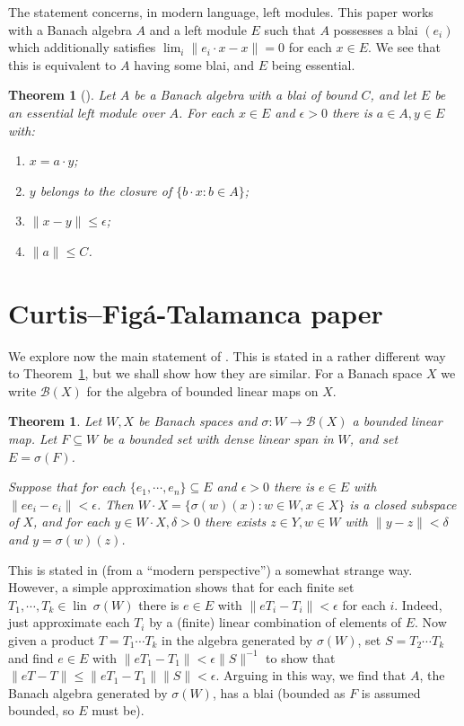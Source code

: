\documentclass[a4paper,11pt]{article}
\newcommand{\mc}[1]{{\mathcal{#1}}}
\newcommand{\lin}{{\operatorname{lin}}}
\newtheorem{theorem}[lemma]{Theorem}
\theoremstyle{definition}
\begin{document}
The statement concerns, in modern language, left modules.  This paper works with a Banach
algebra $A$ and a left module $E$ such that $A$ possesses a blai $(e_i)$ which additionally
satisfies $\lim_i \|e_i\cdot x-x\| =0$ for each $x\in E$.  We see that this is equivalent to
$A$ having some blai, and $E$ being essential.

\begin{theorem}[{\cite[Theorem~2.5]{hewitt}}]\label{thm:ch}
Let $A$ be a Banach algebra with a blai of bound $C$, and let $E$ be an essential left module
over $A$. For each $x\in E$ and $\epsilon>0$ there is $a\in A, y\in E$ with:
\begin{enumerate}
\item $x = a\cdot y$;
\item $y$ belongs to the closure of $\{b\cdot x : b\in A\}$;
\item $\|x-y\| \leq \epsilon$;
\item $\|a\|\leq C$.
\end{enumerate}  
\end{theorem}



\section{Curtis--Fig\'a-Talamanca paper}

We explore now the main statement of \cite{cft}.  This is stated in a rather different
way to Theorem~\ref{thm:ch}, but we shall show how they are similar.
For a Banach space $X$ we write $\mathcal B(X)$ for the algebra of bounded linear maps on $X$.

\begin{theorem}\label{thm:cft}
Let $W,X$ be Banach spaces and $\sigma:W\rightarrow \mc B(X)$ a bounded linear map.
Let $F\subseteq W$ be a bounded set with dense linear span in $W$, and set $E=\sigma(F)$.

Suppose that for each $\{e_1,\cdots,e_n\} \subseteq E$ and $\epsilon>0$ there is $e\in E$
with $\|ee_i - e_i\| < \epsilon$.  Then $W\cdot X = \{ \sigma(w)(x) : w\in W, x\in X \}$
is a closed subspace of $X$, and for each $y\in W\cdot X, \delta>0$ there exists $z\in Y,
w\in W$ with $\|y-z\|<\delta$ and $y = \sigma(w)(z)$.
\end{theorem}

This is stated in (from a ``modern perspective'') a somewhat strange way.  However,
a simple approximation shows that for each finite set $T_1,\cdots,T_k\in \lin\ \sigma(W)$ there
is $e\in E$ with $\|eT_i-T_i\|<\epsilon$ for each $i$.  Indeed, just approximate each $T_i$
by a (finite) linear combination of elements of $E$.
Now given a product $T=T_1\cdots T_k$ in the algebra generated by $\sigma(W)$,
set $S=T_2\cdots T_k$ and find $e\in E$ with $\|eT_1-T_1\|<\epsilon \|S\|^{-1}$ to show
that $\|eT-T\| \leq \|eT_1-T_1\| \|S\| < \epsilon$.  Arguing in this way, we find that
$A$, the Banach algebra generated by $\sigma(W)$, has a blai (bounded as $F$ is assumed
bounded, so $E$ must be).
\end{document}
